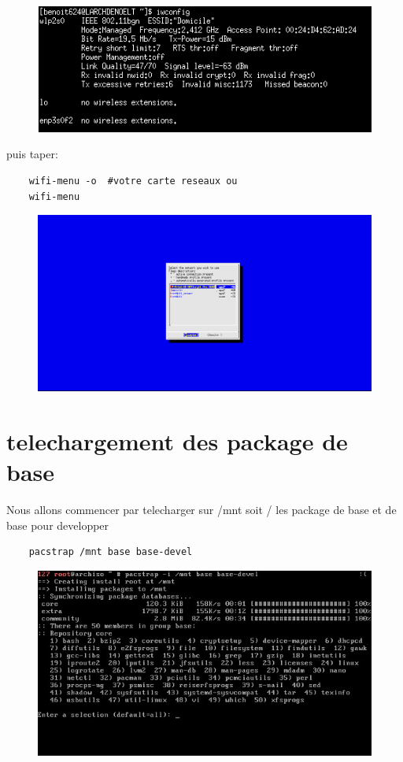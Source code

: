 \documentclass[a4paper]{book}
\begin{document}
  \begin{figure}[h]
    \includegraphics[width=\textwidth]{images/iwconfig}
  \end{figure}
  puis taper:\\
  \begin{lstlisting}
    wifi-menu -o  #votre carte reseaux ou
    wifi-menu
  \end{lstlisting}
  
  \begin{figure}[h]
    \includegraphics[width=\textwidth]{images/wifi-menu}
  \end{figure}
  \chapter{telechargement des package de base}
  Nous allons commencer par telecharger sur /mnt soit / les package de base et de
  base pour developper\\
  \begin{lstlisting}
    pacstrap /mnt base base-devel
  \end{lstlisting}
  
  \begin{figure}[h]
    \includegraphics[width=\textwidth]{images/pacstrapbase}
  \end{figure}
\end{document}
